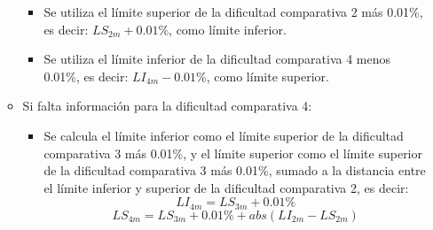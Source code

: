 \documentclass[letterpaper,12pt]{article}
\begin{document}
\begin{enumerate}
\begin{itemize}
                \begin{itemize}
                  \item Se utiliza el límite superior de la dificultad comparativa 2 más 0.01\%, es decir: $LS_{2m} + 0.01\%$, como límite inferior.
                  \item Se utiliza el límite inferior de la dificultad comparativa 4 menos 0.01\%, es decir: $LI_{4m} - 0.01\%$, como límite superior.
                \end{itemize}
          \item Si falta información para la dificultad comparativa 4:
                \begin{itemize}
                  \item Se calcula el límite inferior como el límite superior de la dificultad comparativa 3 más 0.01\%, y el límite superior como el límite superior de la dificultad comparativa 3 más 0.01\%, sumado a la distancia entre el límite inferior y superior de la dificultad comparativa 2, es decir:
                        \begin{equation*}
                          LI_{4m} = LS_{3m} + 0.01\%
                        \end{equation*}
                        \begin{equation*}
                          LS_{4m} = LS_{3m} + 0.01\% + abs(LI_{2m} - LS_{2m})
                        \end{equation*}


\end{itemize}
\end{itemize}
\end{enumerate}
\end{document}
